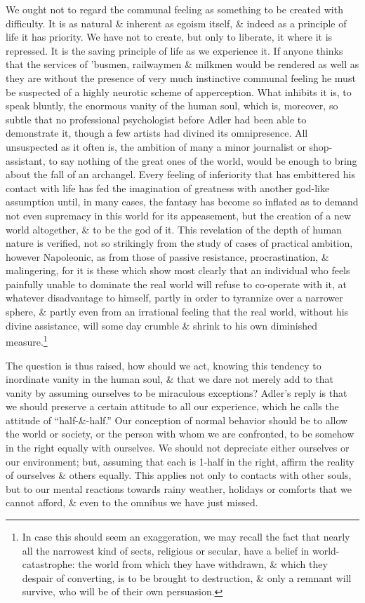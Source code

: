 \documentclass{article}
\numberwithin{equation}{section}
\begin{document}
We ought not to regard the communal feeling as something to be created with difficulty. It is as natural \& inherent as egoism itself, \& indeed as a principle of life it has priority. We have not to create, but only to liberate, it where it is repressed. It is the saving principle of life as we experience it. If anyone thinks that the services of 'busmen, railwaymen \& milkmen would be rendered as well as they are without the presence of very much instinctive communal feeling he must be suspected of a highly neurotic scheme of apperception. What inhibits it is, to speak bluntly, the enormous vanity of the human soul, which is, moreover, so subtle that no professional psychologist before Adler had been able to demonstrate it, though a few artists had divined its omnipresence. All unsuspected as it often is, the ambition of many a minor journalist or shop-assistant, to say nothing of the great ones of the world, would be enough to bring about the fall of an archangel. Every feeling of inferiority that has embittered his contact with life has fed the imagination of greatness with another god-like assumption until, in many cases, the fantasy has become so inflated as to demand not even supremacy in this world for its appeasement, but the creation of a new world altogether, \& to be the god of it. This revelation of the depth of human nature is verified, not so strikingly from the study of cases of practical ambition, however Napoleonic, as from those of passive resistance, procrastination, \& malingering, for it is these which show most clearly that an individual who feels painfully unable to dominate the real world will refuse to co-operate with it, at whatever disadvantage to himself, partly in order to tyrannize over a narrower sphere, \& partly even from an irrational feeling that the real world, without his divine assistance, will some day crumble \& shrink to his own diminished measure.\footnote{In case this should seem an exaggeration, we may recall the fact that nearly all the narrowest kind of sects, religious or secular, have a belief in world-catastrophe: the world from which they have withdrawn, \& which they despair of converting, is to be brought to destruction, \& only a remnant will survive, who will be of their own persuasion.}

The question is thus raised, how should we act, knowing this tendency to inordinate vanity in the human soul, \& that we dare not merely add to that vanity by assuming ourselves to be miraculous exceptions? Adler's reply is that we should preserve a certain attitude to all our experience, which he calls the attitude of ``half-\&-half.'' Our conception of normal behavior should be to allow the world or society, or the person with whom we are confronted, to be somehow in the right equally with ourselves. We should not depreciate either ourselves or our environment; but, assuming that each is 1-half in the right, affirm the reality of ourselves \& others equally. This applies not only to contacts with other souls, but to our mental reactions towards rainy weather, holidays or comforts that we cannot afford, \& even to the omnibus we have just missed.
\end{document}
